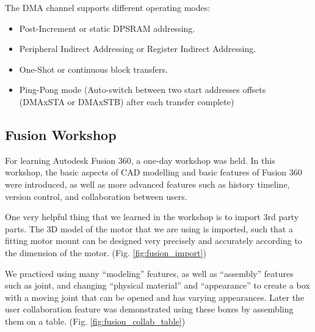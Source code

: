 The DMA channel supports different operating modes:
\begin{itemize}
    \item Post-Increment or static DPSRAM addressing.
    \item Peripheral Indirect Addressing or Register Indirect Addressing.
    \item One-Shot or continuous block transfers.
    \item Ping-Pong mode (Auto-switch between two start addresses offsets (DMAxSTA or DMAxSTB) after each transfer complete)
\end{itemize}




\subsection{Fusion Workshop}
For learning Autodesk Fusion 360, a one-day workshop was held. In this workshop, the basic aspects of CAD modelling and basic features of Fusion 360 were introduced, as well as more advanced features such as history timeline, version control, and collaboration between users.

One very helpful thing that we learned in the workshop is to import 3rd party parts. The 3D model of the motor that we are using is imported, such that a fitting motor mount can be designed very precisely and accurately according to the dimension of the motor. (Fig. \ref{fig:fusion_import})

We practiced using many “modeling” features, as well as “assembly” features such as joint, and changing “physical material” and “appearance” to create a box with a moving joint that can be opened and has varying appearances. Later the user collaboration feature was demonstrated using these boxes by assembling them on a table. (Fig. \ref{fig:fusion_collab_table})

